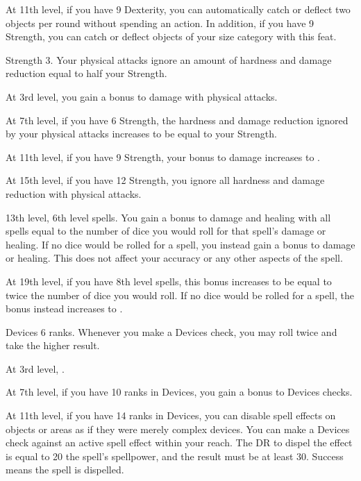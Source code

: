     At 11th level, if you have 9 Dexterity, you can automatically catch or deflect two objects per round without spending an action.
    In addition, if you have 9 Strength, you can catch or deflect objects of your size category with this feat.

    \featpres Strength 3.
    \featben Your physical attacks ignore an amount of hardness and damage reduction equal to half your Strength.

    At 3rd level, you gain a  bonus to damage with physical attacks.

    At 7th level, if you have 6 Strength, the hardness and damage reduction ignored by your physical attacks increases to be equal to your Strength.

    At 11th level, if you have 9 Strength, your bonus to damage increases to .

    At 15th level, if you have 12 Strength, you ignore all hardness and damage reduction with physical attacks.

    \featpre 13th level, 6th level spells.
    \featben You gain a bonus to damage and healing with all spells equal to the number of dice you would roll for that spell's damage or healing.
    If no dice would be rolled for a spell, you instead gain a  bonus to damage or healing.
    This does not affect your accuracy or any other aspects of the spell.

    At 19th level, if you have 8th level spells, this bonus increases to be equal to twice the number of dice you would roll.
    If no dice would be rolled for a spell, the bonus instead increases to .

    \featpre Devices 6 ranks.
    \featben Whenever you make a Devices check, you may roll twice and take the higher result.

    At 3rd level, \tdash.

    At 7th level, if you have 10 ranks in Devices, you gain a  bonus to Devices checks.

    At 11th level, if you have 14 ranks in Devices, you can disable spell effects on objects or areas as if they were merely complex devices.
    You can make a Devices check against an active spell effect within your reach.
    The DR to dispel the effect is equal to 20 \add the spell's spellpower, and the result must be at least 30.
    Success means the spell is dispelled.
    \magical

